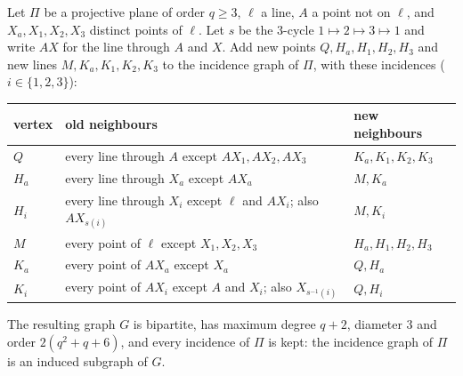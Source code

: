 \begin{proposition}\label{prop:zero}
Let $\Pi$ be a projective plane of order $q \ge 3$, $\ell$ a line, $A$ a point not on $\ell$, and $X_a, X_1, X_2, X_3$
distinct points of $\ell$. Let $s$ be the $3$-cycle $1 \mapsto 2 \mapsto 3 \mapsto 1$ and write $AX$ for the line through $A$
and $X$. Add new points $Q, H_a, H_1, H_2, H_3$ and new lines $M, K_a, K_1, K_2, K_3$ to the incidence graph of $\Pi$,
with these incidences ($i \in \{1,2,3\}$):
\begin{center}
\begin{tabular}{@{}l@{\quad}l@{\quad}l@{}}
\toprule
vertex & old neighbours & new neighbours\\
\midrule
$Q$ & every line through $A$ except $AX_1, AX_2, AX_3$ & $K_a, K_1, K_2, K_3$\\
$H_a$ & every line through $X_a$ except $AX_a$ & $M, K_a$\\
$H_i$ & every line through $X_i$ except $\ell$ and $AX_i$; also $AX_{s(i)}$ & $M, K_i$\\
$M$ & every point of $\ell$ except $X_1, X_2, X_3$ & $H_a, H_1, H_2, H_3$\\
$K_a$ & every point of $AX_a$ except $X_a$ & $Q, H_a$\\
$K_i$ & every point of $AX_i$ except $A$ and $X_i$; also $X_{s^{-1}(i)}$ & $Q, H_i$\\
\bottomrule
\end{tabular}
\end{center}
The resulting graph $G$ is bipartite, has maximum degree $q+2$, diameter $3$ and order $2(q^2+q+6)$, and every
incidence of $\Pi$ is kept: the incidence graph of $\Pi$ is an induced subgraph of $G$.
\end{proposition}

